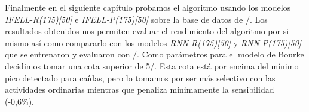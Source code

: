 Finalmente en el siguiente capítulo probamos el algoritmo usando los modelos \textit{IFELL-R(175)[50]} e \textit{IFELL-P(175)[50]} sobre la base de datos de \sisfall/. Los resultados obtenidos nos permiten evaluar el rendimiento del algoritmo por si mismo así como compararlo con los modelos \textit{RNN-R(175)[50]} y \textit{RNN-P(175)[50]} que se entrenaron y evaluaron con \sisfall/. Como parámetros para el modelo de Bourke decidimos tomar una cota superior de 5\g/. Esta cota está por encima del mínimo pico detectado para caídas, pero lo tomamos por ser más selectivo con las actividades ordinarias mientras que penaliza mínimamente la sensibilidad (-0,6\%).

